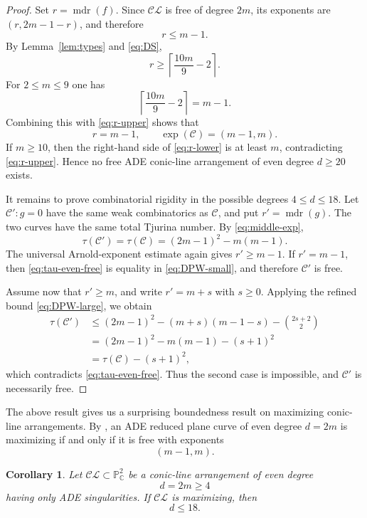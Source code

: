 \documentclass[10pt,a4paper]{amsart}
\newtheorem{corollary}[theorem]{Corollary}
\newcommand{\mdr}{\operatorname{mdr}}
\begin{document}
\begin{proof}
Set $r=\mdr(f)$.  Since $\mathcal{CL}$ is free of degree $2m$, its exponents
are $(r,2m-1-r)$, and therefore
\begin{equation}\label{eq:r-upper}
 r\le m-1.
\end{equation}
By Lemma~\ref{lem:types} and \eqref{eq:DS},
\begin{equation}\label{eq:r-lower}
 r\ge \left\lceil\frac{10m}{9}-2\right\rceil.
\end{equation}
For $2\le m\le9$ one has
\[
 \left\lceil\frac{10m}{9}-2\right\rceil=m-1.
\]
Combining this with \eqref{eq:r-upper} shows that
\begin{equation}\label{eq:middle-exp}
 r=m-1,
 \qquad
 \exp(\mathcal C)=(m-1,m).
\end{equation}
If $m\ge10$, then the right-hand side of \eqref{eq:r-lower} is at least
$m$, contradicting \eqref{eq:r-upper}.  Hence no free ADE conic-line
arrangement of even degree $d\ge20$ exists.

It remains to prove combinatorial rigidity in the possible degrees
$4\le d\le18$.  Let $\mathcal C':g=0$ have the same weak combinatorics as
$\mathcal C$, and put $r'=\mdr(g)$.  The two curves have the same total
Tjurina number.  By \eqref{eq:middle-exp},
\begin{equation}\label{eq:tau-even-free}
 \tau(\mathcal C')=\tau(\mathcal C)
 =(2m-1)^2-m(m-1).
\end{equation}
The universal Arnold-exponent estimate again gives $r'\ge m-1$. If $r'=m-1$, then \eqref{eq:tau-even-free} is equality in
\eqref{eq:DPW-small}, and therefore $\mathcal C'$ is free.

Assume now that $r'\ge m$, and write $r'=m+s$ with $s\ge0$.  Applying the
refined bound \eqref{eq:DPW-large}, we obtain
\begin{align*}
 \tau(\mathcal C')
 &\le (2m-1)^2-(m+s)(m-1-s)-\binom{2s+2}{2}\\
 &= (2m-1)^2-m(m-1)-(s+1)^2\\
 &=\tau(\mathcal C)-(s+1)^2,
\end{align*}
which contradicts \eqref{eq:tau-even-free}.  Thus the second case is
impossible, and $\mathcal C'$ is necessarily free.
\end{proof}
The above result gives us a surprising boundedness result on maximizing conic-line arrangements. By \cite[Theorem 2.9]{max}, an ADE reduced plane curve of even degree $d=2m$ is maximizing if and only if it is free with exponents
\[
(m-1,m).
\]
\begin{corollary}
Let $\mathcal{CL}\subset \mathbb{P}^2_{\mathbb{C}}$ be a conic-line arrangement of even degree
\[
d=2m\geq 4
\]
having only ADE singularities. If $\mathcal{CL}$ is maximizing, then
\[
d\leq 18.
\]
\end{corollary}
\end{document}
